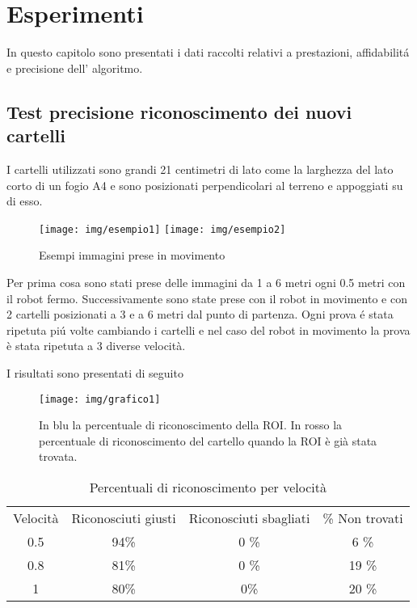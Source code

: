 
\chapter{Esperimenti}
In questo capitolo sono presentati i dati raccolti relativi a prestazioni, affidabilit\'a e precisione dell' algoritmo.

\section{Test precisione riconoscimento dei nuovi cartelli}
	
	I cartelli utilizzati sono grandi 21 centimetri di lato come la larghezza del lato corto di un fogio A4 e sono posizionati perpendicolari al terreno e appoggiati su di esso.
	\begin{figure}[!ht]
		\centering
		\texttt{[image: img/esempio1]}
		\texttt{[image: img/esempio2]}
		\caption[Esempio immagini prese]{Esempi immagini prese in movimento}
	\end{figure}
	Per prima cosa sono stati prese delle immagini da 1 a 6 metri ogni 0.5 metri con il robot fermo. Successivamente sono state prese con il robot in movimento e con 2 cartelli posizionati a 3 e a 6 metri dal punto di partenza. Ogni prova \'e stata ripetuta pi\'u volte cambiando i cartelli e nel caso del robot in movimento la prova è stata ripetuta a 3 diverse velocità.

	I risultati sono presentati di seguito

	\begin{figure}[!ht]
		\centering
		\texttt{[image: img/grafico1]}
		\caption[Grafico precisione riconoscimento]{In blu la percentuale di riconoscimento della ROI. In rosso la percentuale di riconoscimento del cartello quando la ROI è già stata trovata.}
	\end{figure}

	\begin{table}[h]
		\centering
		\begin{tabular}{cccc}
		    Velocità & Riconosciuti giusti & Riconosciuti sbagliati & \% Non trovati \\
			0.5 &   94\%    & 0 \%		& 6 \%    	\\
			0.8 &   81\%    & 0 \%		& 19 \%		\\
			1 	& 	80\%	& 0\%		& 20 \%		\\
		\end{tabular}
		\caption{Percentuali di riconoscimento per velocità}
	\end{table}

